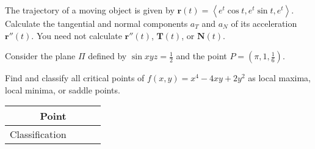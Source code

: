\documentclass[12pt]{exam}
\begin{document}
\begin{questions}

\question[15] 
\newpage

\question[15]
The trajectory of a moving object is
given by $\mathbf{r}\left(t\right)
=\left\langle e^t\cos{t},e^t\sin{t},e^t\right\rangle$.
Calculate the tangential and normal components 
$a_T$ and $a_N$ of its
acceleration $\mathbf{r}''\left(t\right)$. You need
not calculate $\mathbf{r}''\left(t\right)$,
$\mathbf{T}\left(t\right)$, or $\mathbf{N}\left(t\right)$.
\vfill
{}
\newpage

\question[15]
Consider the plane $\Pi$ defined by
$\sin{xyz}=\frac{1}{2}$ and the 
point $P=\left(\pi,1,\frac{1}{6}\right)$.
\newpage

\question[15] Find and classify all critical points
of  $f\left(x,y\right)=x^4-4xy+2y^2$ as local maxima,
local minima, or saddle points.
\vfill
\begin{tabular}{|r|p{1.5in}|p{1.5in}|p{1.5in}|}
\hline\rule{0pt}{24pt}Point&&&\\\hline
Classification\rule{0pt}{24pt}&&&\\\hline
\end{tabular}
\newpage


\end{questions}
\end{document}
